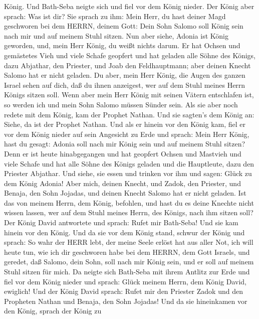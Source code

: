 König.  Und Bath-Seba neigte sich und fiel vor dem König
nieder. Der König aber sprach: Was ist dir?  Sie sprach zu
ihm: Mein Herr, du hast deiner Magd geschworen bei dem HERRN, deinem
Gott: Dein Sohn Salomo soll König sein nach mir und auf meinem Stuhl
sitzen.  Nun aber siehe, Adonia ist König geworden, und,
mein Herr König, du weißt nichts darum.  Er hat Ochsen und
gemästetes Vieh und viele Schafe geopfert und hat geladen alle Söhne des
Königs, dazu Abjathar, den Priester, und Joab den Feldhauptmann; aber
deinen Knecht Salomo hat er nicht geladen.  Du aber, mein
Herr König, die Augen des ganzen Israel sehen auf dich, daß du ihnen
anzeigest, wer auf dem Stuhl meines Herrn Königs sitzen soll.
 Wenn aber mein Herr König mit seinen Vätern entschlafen
ist, so werden ich und mein Sohn Salomo müssen Sünder sein.
 Als sie aber noch redete mit dem König, kam der Prophet
Nathan.  Und sie sagten's dem König an: Siehe, da ist der
Prophet Nathan. Und als er hinein vor den König kam, fiel er vor dem
König nieder auf sein Angesicht zu Erde  und sprach: Mein
Herr König, hast du gesagt: Adonia soll nach mir König sein und auf
meinem Stuhl sitzen?  Denn er ist heute hinabgegangen und
hat geopfert Ochsen und Mastvieh und viele Schafe und hat alle Söhne des
Königs geladen und die Hauptleute, dazu den Priester Abjathar. Und
siehe, sie essen und trinken vor ihm und sagen: Glück zu dem König
Adonia!  Aber mich, deinen Knecht, und Zadok, den Priester,
und Benaja, den Sohn Jojadas, und deinen Knecht Salomo hat er nicht
geladen.  Ist das von meinem Herrn, dem König, befohlen,
und hast du es deine Knechte nicht wissen lassen, wer auf dem Stuhl
meines Herrn, des Königs, nach ihm sitzen soll?  Der König
David antwortete und sprach: Rufet mir Bath-Seba! Und sie kam hinein vor
den König. Und da sie vor dem König stand,  schwur der
König und sprach: So wahr der HERR lebt, der meine Seele erlöst hat aus
aller Not,  ich will heute tun, wie ich dir geschworen habe
bei dem HERRN, dem Gott Israels, und geredet, daß Salomo, dein Sohn,
soll nach mir König sein, und er soll auf meinem Stuhl sitzen für mich.
 Da neigte sich Bath-Seba mit ihrem Antlitz zur Erde und
fiel vor dem König nieder und sprach: Glück meinem Herrn, dem König
David, ewiglich!  Und der König David sprach: Rufet mir den
Priester Zadok und den Propheten Nathan und Benaja, den Sohn Jojadas!
Und da sie hineinkamen vor den König,  sprach der König zu
